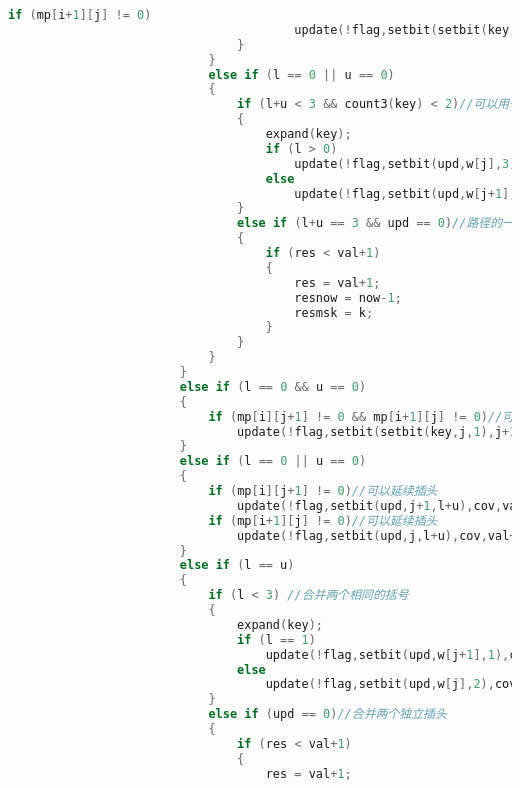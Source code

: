 \begin{lstlisting}[language=c++]
                                    if (mp[i+1][j] != 0)
                                        update(!flag,setbit(setbit(key,j,3),j+1,0),cov,val+1);
                                }
                            }
                            else if (l == 0 || u == 0)
                            {
                                if (l+u < 3 && count3(key) < 2)//可以用一个独立插头来结束这条路径
                                {
                                    expand(key);
                                    if (l > 0)
                                        update(!flag,setbit(upd,w[j],3),cov,val+1);
                                    else
                                        update(!flag,setbit(upd,w[j+1],3),cov,val+1);
                                }
                                else if (l+u == 3 && upd == 0)//路径的一端
                                {
                                    if (res < val+1)
                                    {
                                        res = val+1;
                                        resnow = now-1;
                                        resmsk = k;
                                    }
                                }
                            }
                        }
                        else if (l == 0 && u == 0)
                        {
                            if (mp[i][j+1] != 0 && mp[i+1][j] != 0)//可以新建插头
                                update(!flag,setbit(setbit(key,j,1),j+1,2),cov,val+1);
                        }
                        else if (l == 0 || u == 0)
                        {
                            if (mp[i][j+1] != 0)//可以延续插头
                                update(!flag,setbit(upd,j+1,l+u),cov,val+1);
                            if (mp[i+1][j] != 0)//可以延续插头
                                update(!flag,setbit(upd,j,l+u),cov,val+1);
                        }
                        else if (l == u)
                        {
                            if (l < 3) //合并两个相同的括号
                            {
                                expand(key);
                                if (l == 1)
                                    update(!flag,setbit(upd,w[j+1],1),cov,val+1);
                                else
                                    update(!flag,setbit(upd,w[j],2),cov,val+1);
                            }
                            else if (upd == 0)//合并两个独立插头
                            {
                                if (res < val+1)
                                {
                                    res = val+1;

\end{lstlisting}
